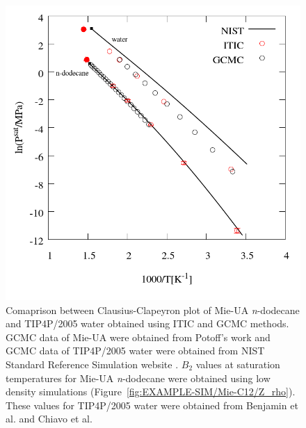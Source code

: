 \documentclass[5p,times]{elsarticle}
\begin{document}
\begin{figure}
\includegraphics[scale=0.30]{Figures/EXAMPLE-SIM_Mie-C12_TIP4P-psat.png}
\caption{Comaprison between Clausius-Clapeyron plot of Mie-UA \textit{n}-dodecane and TIP4P/2005 water obtained using ITIC and GCMC methods. GCMC data of Mie-UA were obtained from Potoff's work\cite{Potoff2009} and GCMC data of TIP4P/2005 water were obtained from NIST Standard Reference Simulation website \cite{Shen2008}. $B_2$ values at saturation temperatures for Mie-UA \textit{n}-dodecane were obtained using low density simulations (Figure~\ref{fig:EXAMPLE-SIM/Mie-C12/Z_rho}). These values for TIP4P/2005 water were obtained from Benjamin et al.\cite{Benjamin2007} and Chiavo et al. \citep{Chialvo2006}}
\label{fig:EXAMPLE-SIM/Mie-C12-TIP4P/Psat}
\end{figure}
\end{document}
